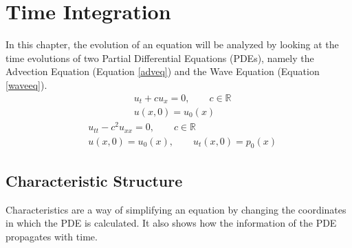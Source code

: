 \chapter{Time Integration}
In this chapter, the evolution of an equation will be analyzed by looking at the time evolutions of two Partial Differential Equations (PDEs), namely the Advection Equation (Equation \ref{adveq}) and the Wave Equation (Equation \ref{waveeq}).
\begin{equation} \label{adveq}
\begin{align}
  &u_t + cu_x = 0, \qquad c \in \mathbb{R} \\ 
  &u(x,0) = u_0(x)
\end{align}
\end{equation}
\begin{equation} \label{waveeq}
\begin{align}
  &u_{tt} - c^2u_{xx} = 0, \qquad c \in \mathbb{R} \\ 
  &u(x,0) = u_0(x), \qquad u_t(x,0) = p_0(x)
\end{align}
\end{equation}
\section{Characteristic Structure}
Characteristics are a way of simplifying an equation by changing the coordinates in which the PDE is calculated. It also shows how the information of the PDE propagates with time.

